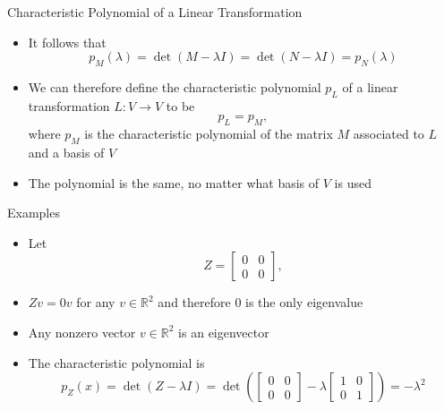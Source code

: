 \documentclass[usenames,dvipsnames,10pt]{beamer}
\newcommand{\R}{\mathbb{R}}
\begin{document}
\begin{frame}
  {Characteristic Polynomial of a Linear Transformation}
  \begin{itemize}
  \item It follows that
    \[
      p_M(\lambda) = \det (M-\lambda I) = \det (N-\lambda I) = p_N(\lambda)
    \]
  \item We can therefore define the characteristic polynomial $p_L$ of a linear transformation $L: V\rightarrow V$ to be
    \[
      p_L = p_M,
    \]
    where $p_M$ is the characteristic polynomial of the matrix $M$ associated to $L$ and a basis of $V$
  \item The polynomial is the same, no matter what basis of $V$ is used
  \end{itemize}
\end{frame}

\begin{frame}
  {Examples}

  \begin{itemize}
  \item Let
    \[
      Z = \begin{bmatrix} 0 & 0 \\ 0 & 0\end{bmatrix},
    \]
  \item $Zv = 0v$ for any $v\in\R^2$ and therefore $0$ is the only eigenvalue
  \item Any nonzero vector $v \in \R^2$ is an eigenvector
  \item The characteristic polynomial is
    \[
      p_Z(x) = \det(Z-\lambda I) = \det\left(\begin{bmatrix} 0 & 0 \\ 0 & 0\end{bmatrix}-
        \lambda\begin{bmatrix} 1 & 0 \\ 0 & 1\end{bmatrix}\right)
      = -\lambda^2
    \]
  \end{itemize}
\end{frame}
\end{document}
